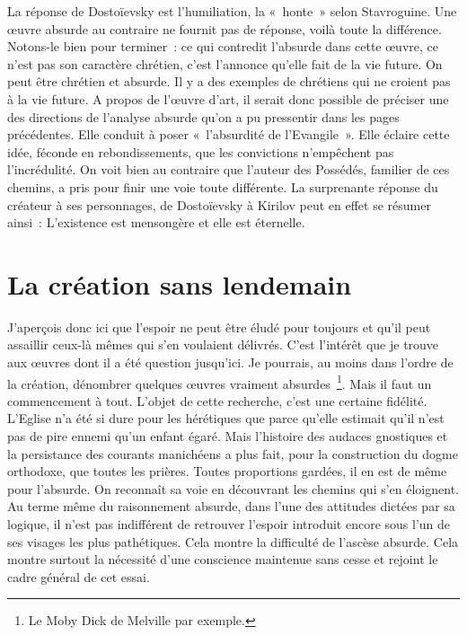 \documentclass{book}
\begin{document}
La réponse de Dostoïevsky est l'humiliation, la « honte » selon Stavroguine. Une œuvre absurde au contraire ne fournit pas de réponse, voilà toute la différence. Notons-le bien pour terminer : ce qui contredit l'absurde dans cette œuvre, ce n'est pas son caractère chrétien, c'est l'annonce qu'elle fait de la vie future. On peut être chrétien et absurde. Il y a des exemples de chrétiens qui ne croient pas à la vie future. A propos de l'œuvre d'art, il serait donc possible de préciser une des directions de l'analyse absurde qu'on a pu pressentir dans les pages précédentes. Elle conduit à poser « l'absurdité de l'Evangile ». Elle éclaire cette idée, féconde en rebondissements, que les convictions n'empêchent pas l'incrédulité. On voit bien au contraire que l'auteur des Possédés, familier de ces chemins, a pris pour finir une voie toute différente. La surprenante réponse du créateur à ses personnages, de Dostoïevsky à Kirilov peut en effet se résumer ainsi : L'existence est mensongère et elle est éternelle.

\section{La création sans lendemain}

J'aperçois donc ici que l'espoir ne peut être éludé pour toujours et qu'il peut assaillir ceux‑là mêmes qui s'en voulaient délivrés. C'est l'inté­rêt que je trouve aux œuvres dont il a été ques­tion jusqu'ici. Je pourrais, au moins dans l'ordre de la création, dénombrer quelques œuvres vrai­ment absurdes \footnote{Le Moby Dick de Melville par exemple.}. Mais il faut un commencement à tout. L'objet de cette recherche, c’est une cer­taine fidélité. L'Eglise n'a été si dure pour les hérétiques que parce qu'elle estimait qu'il n'est pas de pire ennemi qu'un enfant égaré. Mais l'histoire des audaces gnostiques et la persis­tance des courants manichéens a plus fait, pour la construction du dogme orthodoxe, que toutes les prières. Toutes proportions gardées, il en est de même pour l'absurde. On reconnaît sa voie en découvrant les chemins qui s'en éloignent. Au terme même du raisonnement absurde, dans l'une des attitudes dictées par sa logique, il n'est pas indifférent de retrouver l'espoir introduit encore sous l'un de ses visages les plus pathétiques. Cela montre la difficulté de l'ascèse absurde. Cela montre surtout la nécessité d'une conscience maintenue sans cesse et rejoint le cadre général de cet essai.
\end{document}
